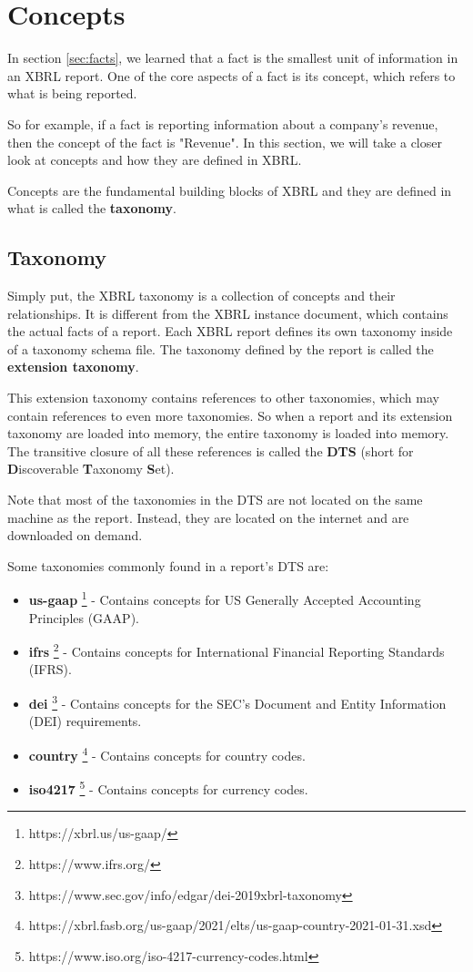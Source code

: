 \section{Concepts}
\label{sec:concepts}

In section \ref{sec:facts}, we learned that a fact is the smallest unit of information in an XBRL report. 
One of the core aspects of a fact is its concept,
which refers to what is being reported.

So for example, if a fact is reporting information about a company's revenue, then the concept of the fact is "Revenue".
In this section, we will take a closer look at concepts and how they are defined in XBRL.

Concepts are the fundamental building blocks of XBRL and they are defined in what is called the \textbf{taxonomy}.

\subsection{Taxonomy}

Simply put, the XBRL taxonomy is a collection of concepts and their relationships.
It is different from the XBRL instance document, which contains the actual facts of a report. 
Each XBRL report defines its own taxonomy inside of a taxonomy schema file. 
The taxonomy defined by the report is called the \textbf{extension taxonomy}.

This extension taxonomy contains references to other taxonomies, which may contain references to even more taxonomies.
So when a report and its extension taxonomy are loaded into memory, the entire taxonomy is loaded into memory.
The transitive closure of all these references is called the \textbf{DTS} (short for \textbf{D}iscoverable \textbf{T}axonomy \textbf{S}et).

Note that most of the taxonomies in the DTS are not located on the same machine as the report.
Instead, they are located on the internet and are downloaded on demand.

Some taxonomies commonly found in a report's DTS are:

\begin{itemize}
    \item \textbf{us-gaap} \footnote{https://xbrl.us/us-gaap/} - Contains concepts for US Generally Accepted Accounting Principles (GAAP).
    \item \textbf{ifrs} \footnote{https://www.ifrs.org/} - Contains concepts for International Financial Reporting Standards (IFRS).
    \item \textbf{dei} \footnote{https://www.sec.gov/info/edgar/dei-2019xbrl-taxonomy} - Contains concepts for the SEC's Document and Entity Information (DEI) requirements.
    \item \textbf{country} \footnote{https://xbrl.fasb.org/us-gaap/2021/elts/us-gaap-country-2021-01-31.xsd} - Contains concepts for country codes.
    \item \textbf{iso4217} \footnote{https://www.iso.org/iso-4217-currency-codes.html} - Contains concepts for currency codes.
\end{itemize}

